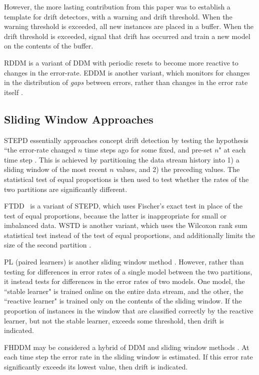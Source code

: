 However, the more lasting contribution from this paper was to establish a template for drift detectors, with a warning and drift threshold. When the warning threshold is exceeded, all new instances are placed in a buffer. When the drift threshold is exceeded, signal that drift has occurred and train a new model on the contents of the buffer.

RDDM is a variant of DDM with periodic resets to become more reactive to changes in the error-rate. EDDM is another variant, which monitors for changes in the distribution of {\it gaps} between errors, rather than changes in the error rate itself \cite{EDDM}.

\subsection{Sliding Window Approaches}

STEPD essentially approaches concept drift detection by testing the hypothesis ``the error-rate changed $n$ time steps ago for some fixed, and pre-set $n$" at each time step \cite{STEPD}. This is achieved by partitioning the data stream history into 1) a sliding window of the most recent $n$ values, and 2) the preceding values. The statistical test of equal proportions is then used to test whether the rates of the two partitions are significantly different.

FTDD \cite{FTDD}%
~is a variant of STEPD, which uses Fischer's exact test %
in place of the test of equal proportions, because the latter is inappropriate for small or imbalanced data. WSTD is another variant, which uses the Wilcoxon rank sum statistical test instead of the test of equal proportions, and additionally limits the size of the second partition \cite{WSTD}.

PL (paired learners) is another sliding window method \cite{PL}. However, rather than testing for differences in error rates of a single model between the two partitions, it instead tests for differences in the error rates of two models. One model, the ``stable learner" is trained online on the entire data stream, and the other, the ``reactive learner" is trained only on the contents of the sliding window. If the proportion of instances in the window that are classified correctly by the reactive learner, but not the stable learner, exceeds some threshold, then drift is indicated.

FHDDM may be considered a hybrid of DDM and sliding window methods \cite{FHDDM}. At each time step the error rate in the sliding window is estimated. If this error rate significantly exceeds its lowest value, then drift is indicated.

